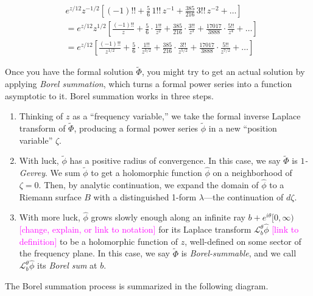 \documentclass{article}
\newcommand{\laplace}{\mathcal{L}}
\newcommand{\series}{\tilde}
\begin{document}
\color{DodgerBlue}
\begin{align*}
& e^{z/12} z^{-1/2} \left[ (-1)!! + \frac{5}{6}\,1!!\,z^{-1} + \frac{385}{216}\,3!!\,z^{-2} + \ldots \right] \\
& = e^{z/12} z^{1/2} \left[ \frac{(-1)!!}{z} + \frac{5}{6} \cdot \frac{1!!}{z^2} + \frac{385}{216} \cdot \frac{3!!}{z^3} + \frac{17017}{3888} \cdot \frac{5!!}{z^4} + \ldots \right] \\
& = e^{z/12} \left[ \frac{(-1)!!}{z^{1/2}} + \frac{5}{6} \cdot \frac{1!!}{z^{3/2}} + \frac{385}{216} \cdot \frac{3!!}{z^{5/2}} + \frac{17017}{3888} \cdot \frac{5!!}{z^{7/2}} + \ldots \right]
\end{align*}
\color{black}

Once you have the formal solution $\series{\Phi}$, you might try to get an actual solution by applying {\em Borel summation}, which turns a formal power series into a function asymptotic to it. Borel summation works in three steps.
\begin{enumerate}
\item Thinking of $z$ as a ``frequency variable,'' we take the formal inverse Laplace transform of $\series{\Phi}$, producing a formal power series $\series{\phi}$ in a new ``position variable'' $\zeta$.
\item With luck, $\series{\phi}$ has a positive radius of convergence. In this case, we say $\series{\Phi}$ is {\em $1$-Gevrey}. We sum $\series{\phi}$ to get a holomorphic function $\hat{\phi}$ on a neighborhood of $\zeta = 0$. Then, by analytic continuation, we expand the domain of $\hat{\phi}$ to a Riemann surface $B$ with a distinguished 1-form $\lambda$---the continuation of $d\zeta$.
\item With more luck, $\hat{\phi}$ grows slowly enough along an infinite ray $b + e^{i\theta}[0, \infty)$ \textcolor{magenta}{[change, explain, or link to notation]} for its Laplace transform $\laplace_b^\theta \hat{\phi}$ \textcolor{magenta}{[link to definition]} to be a holomorphic function of $z$, well-defined on some sector of the frequency plane. In this case, we say $\tilde{\Phi}$ is {\em Borel-summable}, and we call $\laplace_b^\theta \hat{\phi}$ its {\em Borel sum} at $b$.
\end{enumerate}
The Borel summation process is summarized in the following diagram.
\begin{center}
\end{center}
\end{document}

